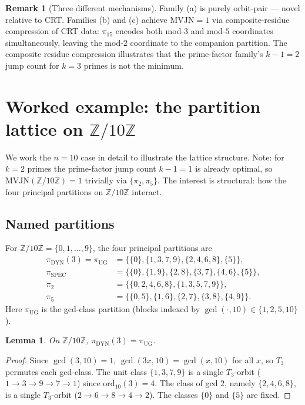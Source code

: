 \documentclass[11pt,reqno]{amsart}
\theoremstyle{plain}
\newtheorem{lemma}[theorem]{Lemma}
\theoremstyle{definition}
\newtheorem{remark}[theorem]{Remark}
\newcommand{\Z}{\mathbb{Z}}
\newcommand{\DYN}{\mathrm{DYN}}
\newcommand{\SPEC}{\mathrm{SPEC}}
\newcommand{\UG}{\mathrm{UG}}
\newcommand{\ord}{\mathrm{ord}}
\newcommand{\MVJN}{\mathrm{MVJN}}
\begin{document}
\begin{remark}[Three different mechanisms]
Family (a) is purely orbit-pair --- novel relative to CRT. Families (b) and (c) achieve $\MVJN = 1$ via composite-residue compression of CRT data: $\pi_{15}$ encodes both mod-$3$ and mod-$5$ coordinates simultaneously, leaving the mod-$2$ coordinate to the companion partition. The composite residue compression illustrates that the prime-factor family's $k - 1 = 2$ jump count for $k = 3$ primes is not the minimum.
\end{remark}

\section{Worked example: the partition lattice on $\Z/10\Z$}

We work the $n = 10$ case in detail to illustrate the lattice structure. Note: for $k = 2$ primes the prime-factor jump count $k - 1 = 1$ is already optimal, so $\MVJN(\Z/10\Z) = 1$ trivially via $\{\pi_2, \pi_5\}$. The interest is structural: how the four principal partitions on $\Z/10\Z$ interact.

\subsection{Named partitions}

For $\Z/10\Z = \{0, 1, \ldots, 9\}$, the four principal partitions are
\begin{align*}
\pi_{\DYN}(3) = \pi_{\UG} &= \{\{0\}, \{1, 3, 7, 9\}, \{2, 4, 6, 8\}, \{5\}\},\\
\pi_{\SPEC} &= \{\{0\}, \{1, 9\}, \{2, 8\}, \{3, 7\}, \{4, 6\}, \{5\}\},\\
\pi_2 &= \{\{0, 2, 4, 6, 8\}, \{1, 3, 5, 7, 9\}\},\\
\pi_5 &= \{\{0, 5\}, \{1, 6\}, \{2, 7\}, \{3, 8\}, \{4, 9\}\}.
\end{align*}
Here $\pi_{\UG}$ is the gcd-class partition (blocks indexed by $\gcd(\cdot, 10) \in \{1, 2, 5, 10\}$).

\begin{lemma} \label{lem:dyn-ug}
On $\Z/10\Z$, $\pi_{\DYN}(3) = \pi_{\UG}$.
\end{lemma}

\begin{proof}
Since $\gcd(3, 10) = 1$, $\gcd(3 x, 10) = \gcd(x, 10)$ for all $x$, so $T_3$ permutes each gcd-class. The unit class $\{1, 3, 7, 9\}$ is a single $T_3$-orbit ($1 \to 3 \to 9 \to 7 \to 1$) since $\ord_{10}(3) = 4$. The class of gcd $2$, namely $\{2, 4, 6, 8\}$, is a single $T_3$-orbit ($2 \to 6 \to 8 \to 4 \to 2$). The classes $\{0\}$ and $\{5\}$ are fixed.
\end{proof}
\end{document}

